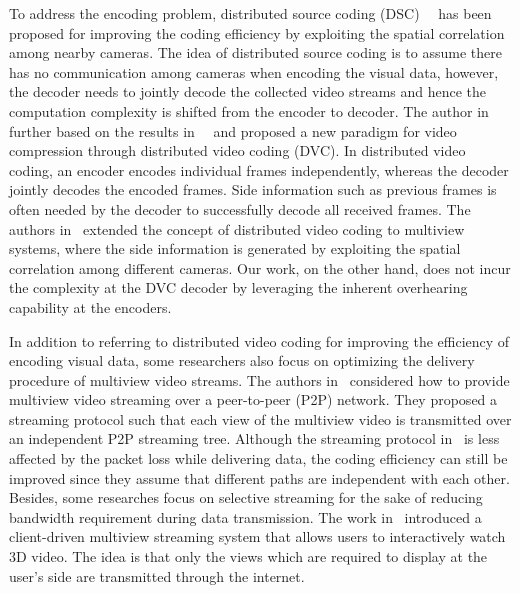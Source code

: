 To address the encoding problem, distributed source coding (DSC)~\cite{SlepianWolf}~\cite{WynerZiv} has been proposed for improving the coding efficiency by exploiting the spatial correlation among nearby cameras.
The idea of distributed source coding is to assume there has no communication among cameras when encoding the visual data, however, the decoder needs to jointly decode the collected video streams and hence the computation complexity is shifted from the encoder to decoder.
The author in~\cite{DVC} further based on the results in~\cite{SlepianWolf}~\cite{WynerZiv} and proposed a new paradigm for video compression through distributed video coding (DVC).
In distributed video coding, an encoder encodes individual frames independently, whereas the decoder jointly decodes the encoded frames.
Side information such as previous frames is often needed by the decoder to successfully decode all received frames.
The authors in~\cite{DVCinMVC} extended the concept of distributed video coding to multiview systems, where the side information is generated by exploiting the spatial correlation among different cameras.
Our work, on the other hand, does not incur the complexity at the DVC decoder by leveraging the inherent overhearing capability at the encoders.

In addition to referring to distributed video coding for improving the efficiency of encoding visual data, some researchers also focus on optimizing the delivery procedure of multiview video streams.
The authors in~\cite{P2Pstreaming} considered how to provide multiview video streaming over a peer-to-peer (P2P) network.
They proposed a streaming protocol such that each view of the multiview video is transmitted over an independent P2P streaming tree.
Although the streaming protocol in~\cite{P2Pstreaming} is less affected by the packet loss while delivering data, the coding efficiency can still be improved since they assume that different paths are independent with each other.
Besides, some researches focus on selective streaming for the sake of reducing bandwidth requirement during data transmission.
The work in~\cite{ClientDrivenStreaming} introduced a client-driven multiview streaming system that allows users to interactively watch 3D video.
The idea is that only the views which are required to display at the user's side are transmitted through the internet.

